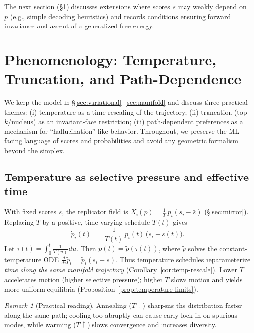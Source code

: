 \documentclass[11pt,reqno]{article}
\numberwithin{equation}{section}
\theoremstyle{plain}
\theoremstyle{definition}
\theoremstyle{remark}
\newtheorem{remark}[theorem]{Remark}
\newcommand{\1}{\mathbbm{1}}
\begin{document}
\medskip
The next section (\S\ref{sec:extensions}) discusses extensions where scores $s$ may weakly depend on $p$ (e.g., simple decoding heuristics) and records conditions ensuring forward invariance and ascent of a generalized free energy.


\section{Phenomenology: Temperature, Truncation, and Path-Dependence}\label{sec:extensions}

We keep the model in \S\ref{sec:variational}--\ref{sec:manifold} and discuss three practical themes:
(i) temperature as a time rescaling of the trajectory; (ii) truncation (top-$k$/nucleus) as an
invariant-face restriction; (iii) path-dependent preferences as a mechanism for ``hallucination''-like
behavior. Throughout, we preserve the ML-facing language of scores and probabilities and avoid any
geometric formalism beyond the simplex.

\subsection{Temperature as selective pressure and effective time}\label{subsec:temp-time}
With fixed scores $s$, the replicator field is $X_i(p)=\tfrac{1}{T}\,p_i(s_i-\bar s)$ (\S\ref{sec:mirror}).
Replacing $T$ by a positive, time-varying schedule $T(t)$ gives
\begin{equation}\label{eq:timevaryingT}
\dot p_i(t)\;=\;\frac{1}{T(t)}\,p_i(t)\,\big(s_i-\bar s(t)\big).
\end{equation}
Let $\tau(t)=\int_0^t \frac{1}{T(u)}\,du$. Then $p(t)=\tilde p(\tau(t))$, where
$\tilde p$ solves the constant-temperature ODE $\frac{d}{d\tau}\tilde p_i=\tilde p_i(s_i-\bar s)$.
Thus temperature schedules reparameterize \emph{time along the same manifold trajectory}
(Corollary~\ref{cor:temp-rescale}). Lower $T$ accelerates motion (higher selective pressure);
higher $T$ slows motion and yields more uniform equilibria (Proposition~\ref{prop:temperature-limits}).

\begin{remark}[Practical reading]
Annealing ($T\downarrow$) sharpens the distribution faster along the same path; cooling too abruptly
can cause early lock-in on spurious modes, while warming ($T\uparrow$) slows convergence and increases diversity.
\end{remark}
\end{document}
